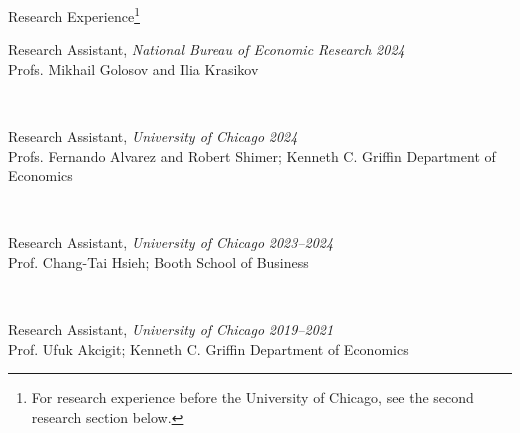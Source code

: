 \documentclass{resume} %
\begin{document}
		\begin{rSection}{Research Experience\footnote{For research experience before the University of Chicago, see the second research section below.}}
			\parbox{\linewidth}{Research Assistant, \textit{National Bureau of Economic Research} \hfill {\em 2024}\\[-0.25em]
			{\small Profs. Mikhail Golosov and Ilia Krasikov}}\\[0.35em]

			\parbox{\linewidth}{Research Assistant, \textit{University of Chicago} \hfill {\em 2024}\\[-0.25em]
			{\small Profs. Fernando Alvarez and Robert Shimer; Kenneth C. Griffin Department of Economics}}\\[0.35em]

			\parbox{\linewidth}{Research Assistant, \textit{University of Chicago} \hfill {\em 2023--2024}\\[-0.25em]
			{\small Prof. Chang-Tai Hsieh; Booth School of Business}}\\[0.35em]

			\parbox{\linewidth}{Research Assistant, \textit{University of Chicago} \hfill {\em 2019--2021}\\[-0.25em]
			{\small Prof. Ufuk Akcigit; Kenneth C. Griffin Department of Economics}}

	\end{rSection}
\end{document}

